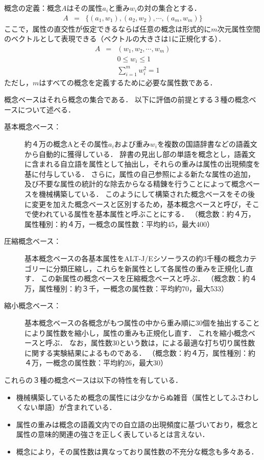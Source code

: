 概念の定義：概念$A$はその属性$a_i$と重み$w_i$の対の集合とする．
\begin{eqnarray}
A &=& \{ (a_1, w_1), (a_2, w_2), \cdots, (a_m, w_m) \}
\end{eqnarray}
ここで，属性の直交性が仮定できるならば任意の概念は形式的に$m$次元属性空間のベクトルとして表現できる（ベクトルの大きさは1に正規化する）．
\begin{eqnarray}
A &=& (w_1, w_2, \cdots, w_m) \label{Vector} \\
  & & 0 \le w_i \le 1 \nonumber \\
  & & \sum_{i=1}^m w_i^2 = 1 \nonumber
\end{eqnarray}
ただし，$m$はすべての概念を定義するために必要な属性数である．

概念ベースはそれら概念の集合である．
以下に評価の前提とする３種の概念ベースについて述べる．
\begin{description}
	\item[基本概念ベース：] 約４万の概念Aとその属性$a_i$および重み$w_i$を複数の国語辞書などの語義文から自動的に獲得している．
辞書の見出し部の単語を概念とし，語義文に含まれる自立語を属性として抽出し，それらの重みは属性の出現頻度を基に付与している．
さらに，属性の自己参照による新たな属性の追加，及び不要な属性の統計的な除去からなる精錬を行うことによって概念ベースを機械構築している．
このようにして構築された概念ベースをその後に変更を加えた概念ベースと区別するため，基本概念ベースと呼び，そこで使われている属性を基本属性と呼ぶことにする．
（概念数：約４万，属性種別：約４万，一概念の属性数：平均約45，最大400）

	\item[圧縮概念ベース：] 基本概念ベースの各基本属性をALT-J/Eシソーラス\cite{ikehara}の約3千種の概念カテゴリーに分類圧縮し，これらを新属性として各属性の重みを正規化し直す．
この新属性の概念ベースを圧縮概念ベースと呼ぶ．
（概念数：約４万，属性種別：約３千，一概念の属性数：平均約70，最大533）

	\item[縮小概念ベース：] 基本概念ベースの各概念がもつ属性の中から重み順に30個を抽出することにより属性数を縮小し，属性の重みも正規化し直す．
これを縮小概念ベースと呼ぶ．
なお，属性数30という数は，\cite{irie}による最適な打ち切り属性数に関する実験結果によるものである．
 （概念数：約４万，属性種別：約４万，一概念の属性数：平均約26，最大30）
\end{description}

これらの３種の概念ベースは以下の特性を有している．
\begin{itemize}
\item 機械構築しているため概念の属性には少なからぬ雑音（属性としてふさわしくない単語）が含まれている．
\item 属性の重みは概念の語義文内での自立語の出現頻度に基づいており，概念と属性の意味的関連の強さを正しく表しているとは言えない．
\item 概念により，その属性数は異なっており属性数の不充分な概念も多々ある．
\end{itemize}

